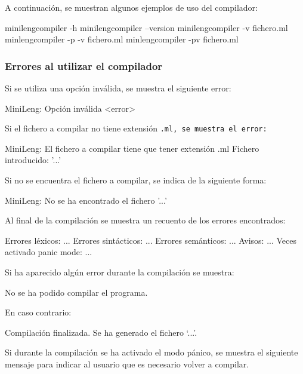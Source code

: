 A continuación, se muestran algunos ejemplos de uso del compilador:

\begin{codigo}
minilengcompiler -h
minilengcompiler --version
minilengcompiler -v fichero.ml
minlengcompiler -p -v fichero.ml
minlengcompiler -pv fichero.ml
\end{codigo}

\subsubsection{Errores al utilizar el compilador}
Si se utiliza una opción inválida, se muestra el siguiente error:

\begin{codigo}
MiniLeng: Opción inválida <error>
\end{codigo}

Si el fichero a compilar no tiene extensión \tt{.ml}, se muestra el error:

\begin{codigo}
MiniLeng: El fichero a compilar tiene que tener extensión .ml
          Fichero introducido: '...'
\end{codigo}

Si no se encuentra el fichero a compilar, se indica de la siguiente forma:

\begin{codigo}
MiniLeng: No se ha encontrado el fichero '...'
\end{codigo}

Al final de la compilación se muestra un recuento de los errores encontrados:

\begin{codigo}
Errores léxicos: ...
Errores sintácticos: ...
Errores semánticos: ...
Avisos: ...
Veces activado panic mode: ...
\end{codigo}

Si ha aparecido algún error durante la compilación se muestra:

\begin{codigo}
No se ha podido compilar el programa.
\end{codigo}

En caso contrario:

\begin{codigo}
Compilación finalizada. Se ha generado el fichero `...'.
\end{codigo}

Si durante la compilación se ha activado el modo pánico, se muestra el siguiente mensaje para indicar al usuario que es necesario volver a compilar.

